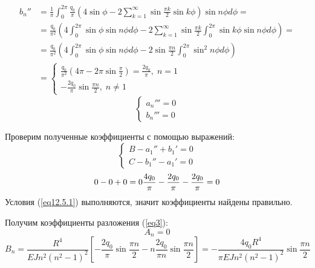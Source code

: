 \begin{equation}
    \label{eq12.4}
    \begin{split}
        b_n'' & = \frac{1}{\pi} \int_{0}^{2\pi} \frac{q_0}{\pi} \left( 4\sin \phi - 2 \sum_{k=1}^{\infty} \sin \frac{\pi k}{2} \sin k\phi \right) \sin n\phi d\phi =
        \\
        & = \frac{q_0}{\pi^2} \left( 4\int_{0}^{2\pi} \sin\phi \sin n\phi d\phi - 2\sum_{k=1}^{\infty} \sin \frac{\pi k}{2} \int_{0}^{2\pi} \sin k\phi \sin n\phi d\phi \right) = 
        \\
        & = \frac{q_0}{\pi^2} \left( 4\int_{0}^{2\pi} \sin \phi \sin n\phi d\phi - 2\sin \frac{\pi n}{2} \int_{0}^{2\pi} \sin^2 n\phi d\phi \right)
        \\
        & = 
        \begin{cases}
            \displaystyle \frac{q_0}{\pi^2} \left( 4\pi - 2\pi \sin \frac{\pi}{2} \right) = \frac{2q_0}{\pi}, \; n = 1
            \\[10pt]
            \displaystyle -\frac{2q_0}{\pi} \sin \frac{\pi n}{2}, \; n \neq 1
        \end{cases}
    \end{split}
\end{equation}
\begin{equation}
    \label{eq12.5}
    \begin{cases}
        a_n''' = 0
        \\
        b_n''' = 0
    \end{cases}
\end{equation}

Проверим полученные коэффициенты с помощью выражений:
\begin{equation}
    \label{eq12.5.1}
    \begin{cases}
        B - a_1'' + b_1' = 0
        \\
        C - b_1'' - a_1' = 0
    \end{cases}
\end{equation}
\begin{equation}
    \label{eq12.5.2}
    0 - 0 + 0 = 0
    \\
    \frac{4q_0}{\pi} - \frac{2q_0}{\pi} - \frac{2q_0}{\pi} = 0
\end{equation}
Условия (\ref{eq12.5.1}) выполняются, значит коэффициенты найдены правильно.

Получим коэффициенты разложения (\ref{eq3}):
\begin{equation}
    \label{eq12.6}
    A_n = 0
\end{equation}
\begin{equation}
    \label{eq12.7}
    B_n = \frac{R^4}{EJn^2(n^2 - 1)^2} \left[ -\frac{2q_0}{\pi} \sin \frac{\pi n}{2} -n \frac{2q_0}{\pi n} \sin \frac{\pi n}{2} \right] = -\frac{4q_0R^4}{\pi EJn^2(n^2 - 1)^2} \sin \frac{\pi n}{2}
\end{equation}


